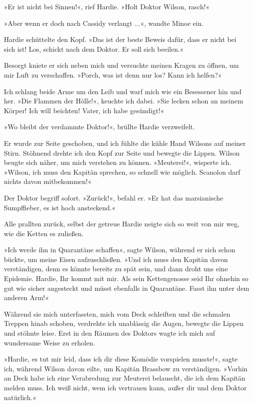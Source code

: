 »Er ist nicht bei Sinnen!«, rief Hardie. »Holt Doktor Wilson,
rasch!«

»Aber wenn er doch nach Cassidy verlangt ...«, wandte Minoe ein.

Hardie schüttelte den Kopf. »Das ist der beste Beweis dafür, dass
er nicht bei sich ist! Los, schickt nach dem Doktor. Er soll sich
beeilen.«

Besorgt kniete er sich neben mich und versuchte meinen Kragen zu
öffnen, um mir Luft zu verschaffen. »Porch, was ist denn nur los?
Kann ich helfen?«

Ich schlang beide Arme um den Leib und warf mich wie ein Besessener
hin und her. »Die Flammen der Hölle!«, keuchte ich dabei. »Sie
lecken schon an meinem Körper! Ich will beichten! Vater, ich habe
gesündigt!«

»Wo bleibt der verdammte Doktor!«, brüllte Hardie verzweifelt.

Er wurde zur Seite geschoben, und ich fühlte die kühle Hand Wilsons
auf meiner Stirn. Stöhnend drehte ich den Kopf zur Seite und
bewegte die Lippen. Wilson beugte sich näher, um mich verstehen zu
können. »Meuterei!«, wisperte ich. »Wilson, ich muss den Kapitän
sprechen, so schnell wie möglich. Scanolon darf nichts davon
mitbekommen!«

Der Doktor begriff sofort. »Zurück!«, befahl er. »Er hat das
marsianische Sumpffieber, es ist hoch ansteckend.«

Alle prallten zurück, selbst der getreue Hardie neigte sich so weit
von mir weg, wie die Ketten es zuließen.

»Ich werde ihn in Quarantäne schaffen«, sagte Wilson, während er
sich schon bückte, um meine Eisen aufzuschließen. »Und ich muss den
Kapitän davon verständigen, denn es könnte bereits zu spät sein,
und dann droht uns eine Epidemie. Hardie, Ihr kommt mit mir. Als
sein Kettengenosse seid Ihr ohnehin so gut wie sicher angesteckt
und müsst ebenfalls in Quarantäne. Fasst ihn unter dem anderen
Arm!«

Während sie mich unterfassten, mich vom Deck schleiften und die
schmalen Treppen hinab schoben, verdrehte ich unablässig die Augen,
bewegte die Lippen und stöhnte leise. Erst in den Räumen des
Doktors wagte ich mich auf wundersame Weise zu erholen.

»Hardie, es tut mir leid, dass ich dir diese Komödie vorspielen
musste!«, sagte ich, während Wilson davon eilte, um Kapitän
Brassbow zu verständigen. »Vorhin an Deck habe ich eine Verabredung
zur Meuterei belauscht, die ich dem Kapitän melden muss. Ich weiß
nicht, wem ich vertrauen kann, außer dir und dem Doktor
natürlich.«

